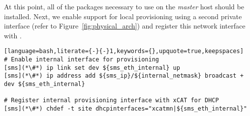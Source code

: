 At this point, all of the packages necessary to use \xCAT{} on the {\em master}
host should be installed. Next, we enable support for local provisioning using
a second private interface (refer to Figure~\ref{fig:physical_arch}) and
register this network interface with \xCAT{}.

\begin{lstlisting}[language=bash,literate={-}{-}1,keywords={},upquote=true,keepspaces]
# Enable internal interface for provisioning
[sms](*\#*) ip link set dev ${sms_eth_internal} up
[sms](*\#*) ip address add ${sms_ip}/${internal_netmask} broadcast + dev ${sms_eth_internal}

# Register internal provisioning interface with xCAT for DHCP
[sms](*\#*) chdef -t site dhcpinterfaces="xcatmn|${sms_eth_internal}"

\end{lstlisting}
